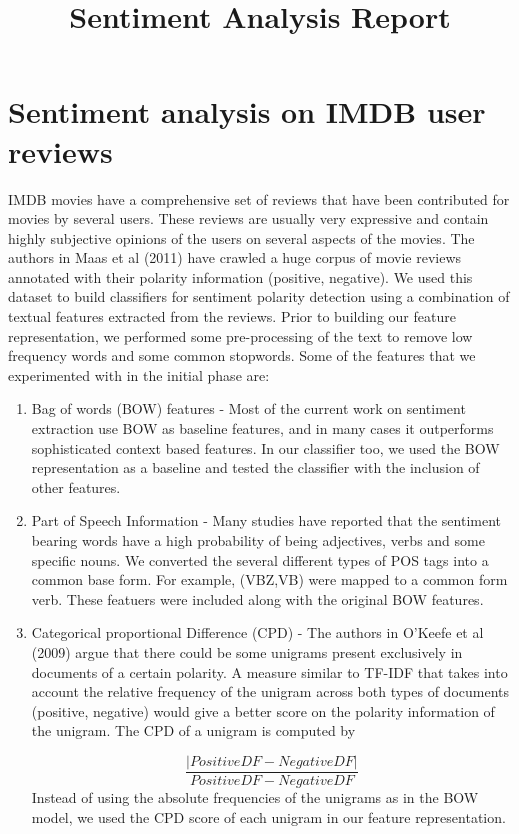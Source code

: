 \documentclass[12pt,a4paper,oneside]{article}
\begin{document}
\title{Sentiment Analysis Report}
\author{}

\maketitle
\section{Sentiment analysis on IMDB user reviews}
IMDB movies have a comprehensive set of reviews that have been contributed for movies by several users. These reviews are usually very expressive and
contain highly subjective opinions of the users on several aspects of the movies. The authors in Maas et al (2011) have crawled a huge corpus of movie reviews annotated with their polarity information (positive, negative). We used this dataset to build classifiers for sentiment polarity detection using a combination of textual features extracted from the reviews. Prior to building our feature representation, we performed some pre-processing of the text to remove low frequency words and some common stopwords. Some of the features that we experimented with in the initial phase are:

\begin{enumerate}
\item Bag of words (BOW) features - Most of the current work on sentiment extraction use BOW as baseline features, and in many cases it outperforms sophisticated context based features. In our classifier too, we used the BOW representation as a baseline and tested the classifier with the inclusion of other features.

\item Part of Speech Information - Many studies have reported that the sentiment bearing words have a high probability of being adjectives, verbs and some specific nouns. We converted the several different types of POS tags into a common base form. For example, (VBZ,VB) were mapped to a common form verb.
These featuers were included along with the original BOW features.

\item Categorical proportional Difference (CPD) - The authors in O'Keefe et al (2009) argue that there could be some unigrams present exclusively in documents of a certain polarity. A measure similar to TF-IDF that takes into account the relative frequency of the unigram across both types of documents (positive, negative) would give a better score on the polarity information of the unigram. The CPD of a unigram is computed by

\begin{equation}
\frac{|PositiveDF - NegativeDF|}{PositiveDF - NegativeDF}
\end{equation}
Instead of using the absolute frequencies of the unigrams as in the BOW model, we used the CPD score of each unigram in our feature representation.

\end{enumerate}
\end{document}
